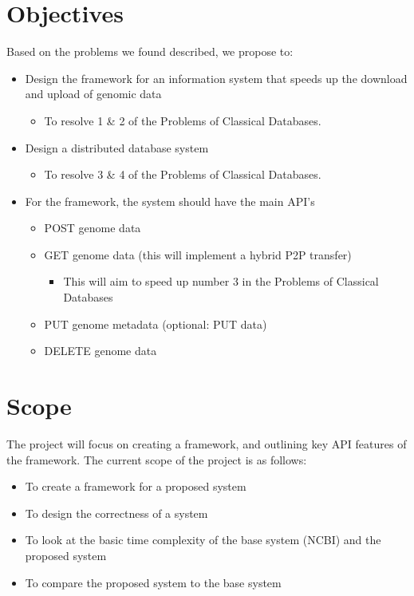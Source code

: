 \documentclass[acmsmall]{acmart}
\begin{document}
\section{Objectives}

Based on the problems we found described, we propose to:

\begin{itemize}
    \item Design the framework for an information system that speeds up the download and upload of genomic data
    \begin{itemize} 
        \item To resolve 1 \& 2 of the Problems of Classical Databases. 
    \end{itemize}
    \item  Design a distributed database system
    \begin{itemize}
        \item To resolve 3 \& 4 of the Problems of Classical Databases. 
    \end{itemize}
\end{itemize}

\begin{itemize}
    \item For the framework, the system should have the main API’s 
    \begin{itemize}
        \item POST genome data
        \item GET genome data (this will implement a hybrid P2P transfer)
        \begin{itemize}
            \item This will aim to speed up number 3 in the Problems of Classical Databases
        \end{itemize}
        \item PUT genome metadata (optional: PUT data)
        \item DELETE genome data
    \end{itemize}
\end{itemize}


\section{Scope}

The project will focus on creating a framework, and outlining key API features of the framework. The current scope of the project is as follows:

\begin{itemize}
    \item To create a framework for a proposed system
    \item To design the correctness of a system
    \item To look at the basic time complexity of the base system (NCBI) and the proposed system
    \item To compare the proposed system to the base system

\end{itemize}
\end{document}

